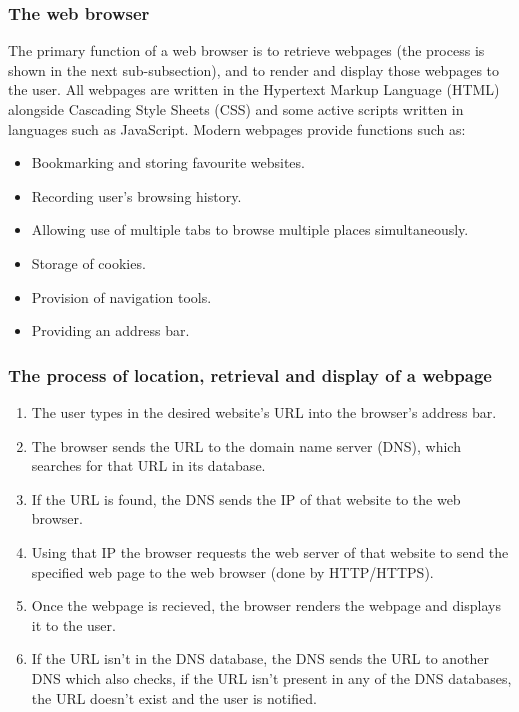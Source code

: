 \documentclass{article}
\begin{document}
\subsubsection{The web browser}
The primary function of a web browser is to retrieve webpages (the process is shown
in the next sub-subsection), and to render and display those webpages to the user. All
webpages are written in the Hypertext Markup Language (HTML) alongside Cascading Style
Sheets (CSS) and some active scripts written in languages such as JavaScript. Modern
webpages provide functions such as:
\begin{itemize}
	\item Bookmarking and storing favourite websites.
	\item Recording user's browsing history.
	\item Allowing use of multiple tabs to browse multiple places simultaneously.
	\item Storage of cookies.
	\item Provision of navigation tools.
	\item Providing an address bar.
\end{itemize}

\subsubsection{The process of location, retrieval and display of a webpage}
\begin{enumerate}
	\item The user types in the desired website's URL into the browser's address bar.
	\item The browser sends the URL to the domain name server (DNS), which searches
		for that URL in its database. 
	\item If the URL is found, the DNS sends the IP of that website to the web browser.
	\item Using that IP the browser requests the web server of that website to send the
		specified web page to the web browser (done by HTTP/HTTPS).
	\item Once the webpage is recieved, the browser renders the webpage and displays it
		to the user.
	\item If the URL isn't in the DNS database, the DNS sends the URL to another DNS
		which also checks, if the URL isn't present in any of the DNS databases, the 
		URL doesn't exist and the user is notified.
\end{enumerate}
\end{document}
